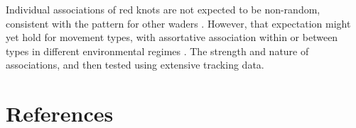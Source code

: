 Individual associations of red knots are not expected to be non-random,
consistent with the pattern for other waders
\citep{myers1983, conklin2008}. However, that expectation might yet hold
for movement types, with assortative association within or between types
in different environmental regimes \citep{spiegel2017}. The strength and
nature of associations, and then tested using extensive tracking data. 

\nolinenumbers

\newpage

 

\part{References}
\footnotesize
\changemargin{-1.0cm}{-1.0cm}



